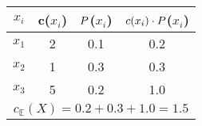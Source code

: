 \qquad
 \begin{tabular}{cccc}
\multicolumn{1}{c|}{$x_i$} & c($x_i$) & ${P}$($x_i$) & $c(x_i)\cdot{P}$($x_i$) \\ \hline
\multicolumn{1}{c|}{$x_1$} & 2        & 0.1      & 0.2                   \\
\multicolumn{1}{c|}{$x_2$} & 1        & 0.3      & 0.3                   \\
\multicolumn{1}{c|}{$x_3$} & 5        & 0.2      & 1.0                   \\ \hline
\multicolumn{4}{c}{$c_{\mathbb{E}}(X)=0.2+0.3+1.0=1.5$}                                
\end{tabular}
